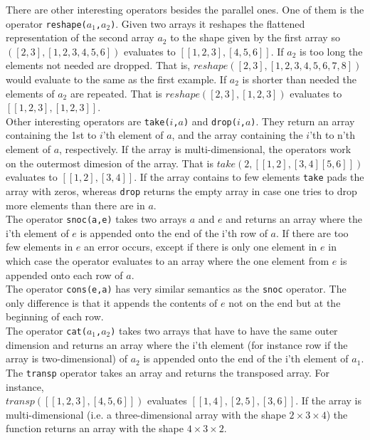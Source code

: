 \documentclass[11pt]{article}
\begin{document}
There are other interesting operators besides the parallel ones. One of them is the operator {\tt reshape($a_1$,$a_2$)}.
Given two arrays it reshapes the flattened representation of the second array $a_2$ to the shape given by the first array so $([2,3],[1,2,3,4,5,6])$ evaluates to $[[1,2,3],[4,5,6]]$.
If $a_2$ is too long the elements not needed are dropped. That is, $reshape([2,3],[1,2,3,4,5,6,7,8])$ would evaluate to the same as the first example.
If $a_2$ is shorter than needed the elements of $a_2$ are repeated. That is $reshape([2,3],[1,2,3])$ evaluates to $[[1,2,3],[1,2,3]]$.\\

Other interesting operators are {\tt take($i$,$a$)} and {\tt drop($i$,$a$)}.
They return an array containing the 1st to $i$'th element of $a$,
and the array containing the $i$'th to n'th element of $a$, respectively.
If the array is multi-dimensional, the operators work on the outermost dimesion of the array. That is $take(2,[[1,2],[3,4][5,6]])$ evaluates to $[[1,2],[3,4]]$.
If the array contains to few elements {\tt take} pads the array with zeros,
whereas {\tt drop} returns the empty array in case one tries to drop more elements than there are in $a$. \\

The operator {\tt snoc(a,e)} takes two arrays $a$ and $e$ and returns an array where the i'th element of $e$ is appended onto the end of the i'th row of $a$.
If there are too few elements in $e$ an error occurs,
except if there is only one element in $e$ in which case the operator evaluates to an array where the one element from $e$
is appended onto each row of $a$.\\

The operator {\tt cons(e,a)} has very similar semantics as the {\tt snoc} operator.
The only difference is that it appends the contents of $e$ not on the end but at the beginning of each row.\\

The operator {\tt cat($a_1$,$a_2$)} takes two arrays that have to have the same outer dimension and returns an array where the i'th element (for instance row if the array is two-dimensional) of $a_2$ is appended onto the end of the i'th element of $a_1$.\\

The {\tt transp} operator takes an array and returns the transposed array. For instance,\\
 $transp([[1,2,3],[4,5,6]])$ evaluates $[[1,4],[2,5],[3,6]]$. If the array is multi-dimensional (i.e. a three-dimensional array with the shape $2\times3\times4$) the function returns an array with the shape $4\times3\times2$.\\
\end{document}
